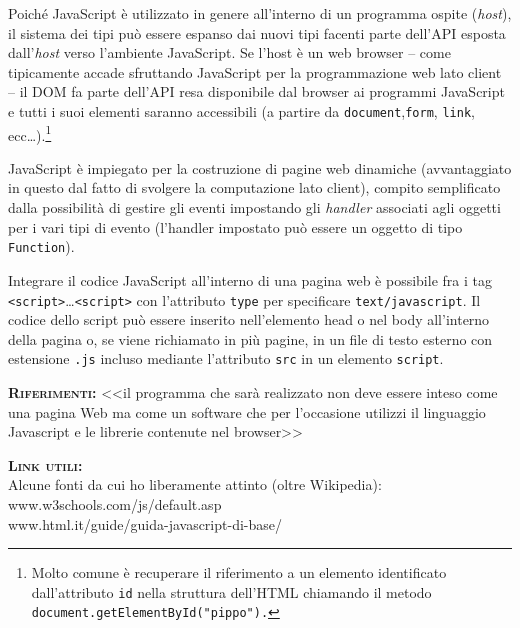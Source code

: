 \begin{description}
  Poiché JavaScript è utilizzato in genere all'interno di un programma ospite (\textit{host}), il sistema dei tipi può essere espanso dai nuovi tipi facenti parte dell'API esposta dall'\textit{host} verso l'ambiente JavaScript. Se l'host è un web browser -- come tipicamente accade sfruttando JavaScript per la programmazione web lato client --  il DOM fa parte dell'API resa disponibile dal browser ai programmi JavaScript e tutti i suoi elementi saranno accessibili (a partire da \texttt{document},\texttt{form}, \texttt{link}, ecc\dots).\footnote{%
    Molto comune è recuperare il riferimento a un elemento identificato dall'attributo \texttt{id} nella struttura dell'HTML chiamando il metodo \texttt{document.getElementById("pippo").}
  }
  
  JavaScript è impiegato per la costruzione di pagine web dinamiche (avvantaggiato in questo dal fatto di svolgere la computazione lato client), compito semplificato dalla possibilità di gestire gli eventi impostando gli \textit{handler} associati agli oggetti per i vari tipi di evento (l'handler impostato può essere un oggetto di tipo \texttt{Function}).
  
  Integrare il codice JavaScript all'interno di una pagina web è possibile fra i tag \texttt{<script>}\dots\texttt{<script>} con l'attributo \texttt{type} per specificare \texttt{text/javascript}. Il codice dello script può essere inserito nell'elemento head o nel body all'interno della pagina o, se viene richiamato in più pagine, in un file di testo esterno con estensione \texttt{.js} incluso mediante l'attributo \texttt{src} in un elemento \texttt{script}.
  
	\item{\scshape\bfseries Riferimenti:}
  <<il programma che sarà realizzato non deve essere inteso come una pagina Web ma come un software che per l'occasione utilizzi il linguaggio Javascript e le librerie contenute nel browser>>

	\item{\scshape\bfseries Link utili:}\\
  Alcune fonti da cui ho liberamente attinto (oltre Wikipedia):\\
  www.w3schools.com/js/default.asp\\
  www.html.it/guide/guida-javascript-di-base/
\end{description}
